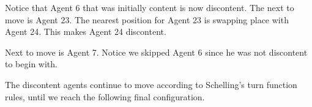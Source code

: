\documentclass[../main.tex]{subfiles}
\begin{document}
Notice that Agent 6 that was initially content is now discontent. The next to move is Agent 23. The nearest position for Agent 23 is swapping place with Agent 24. This makes Agent 24 discontent.
\begin{table}[H]
\begin{center}
\end{center}
\end{table}

Next to move is Agent 7. Notice we skipped Agent 6 since he was not discontent to begin with.

\begin{table}[H]
\begin{center}
\end{center}
\end{table}

The discontent agents continue to move according to Schelling's turn function rules, until we reach the following final configuration.
\begin{table}[H]
\begin{center}
\end{center}
\end{table}
\end{document}
